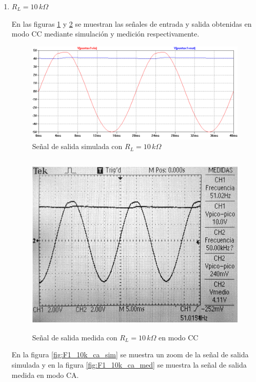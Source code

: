 \documentclass[10pt,spanish,a4paper,openany,notitlepage]{article}
\begin{document}
\begin{enumerate}
    \item $R_L = 10\,\unit{k\Omega}$
    
    En las figuras \ref{fig:F1_10k_cc_sim} y \ref{fig:F1_10k_cc_med} se muestran las señales de entrada
    y salida obtenidas en modo CC mediante simulación y medición respectivamente. 

    \begin{figure}[H]
    \centering
    \includegraphics[scale=0.65]{simulaciones/F1_vo_RL-10k.png}
    \caption{Señal de salida simulada con $R_L = 10\,\unit{k\Omega}$}
    \label{fig:F1_10k_cc_sim}
    \end{figure}
    
    \begin{figure}[H]
    \centering
    \includegraphics[width=350pt, height=250pt]{mediciones/F1-10K.jpg}
    \caption{Señal de salida medida con $R_L = 10\,\unit{k\Omega}$ en modo CC}
    \label{fig:F1_10k_cc_med}
    \end{figure}
    
    En la figura \ref{fig:F1_10k_ca_sim} se muestra un zoom de la señal de salida simulada y en
    la figura \ref{fig:F1_10k_ca_med} se muestra la señal de salida medida en modo CA.
    

\end{enumerate}
\end{document}
